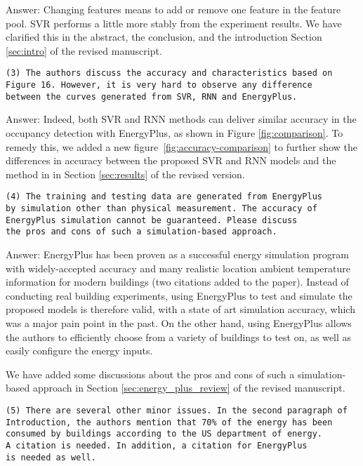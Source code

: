 Answer: Changing features means to add or remove one feature in the
feature pool. SVR performs a little more stably from the experiment
results. We have clarified this in the abstract, the conclusion, and
the introduction Section \ref{sec:intro} of the revised manuscript.

\begin{verbatim}
(3) The authors discuss the accuracy and characteristics based on
Figure 16. However, it is very hard to observe any difference
between the curves generated from SVR, RNN and EnergyPlus.
\end{verbatim}

Answer: Indeed, both SVR and RNN methods can deliver similar accuracy
in the occupancy detection with EnergyPlus, as shown in Figure
\ref{fig:comparison}. To remedy this, we added a new figure~\ref{fig:accuracy-comparison}
to further show the differences in accuracy between the proposed SVR
and RNN models and the method in \cite{dong2014real} in Section
\ref{sec:results} of the revised version.

\begin{verbatim}
(4) The training and testing data are generated from EnergyPlus
by simulation other than physical measurement. The accuracy of
EnergyPlus simulation cannot be guaranteed. Please discuss
the pros and cons of such a simulation-based approach.
\end{verbatim}

Answer: EnergyPlus has been proven as a successful energy simulation
program with widely-accepted accuracy and many realistic location
ambient temperature information for modern buildings (two citations
added to the paper).  Instead of conducting real building experiments,
using EnergyPlus to test and simulate the proposed models is therefore
valid, with a state of art simulation accuracy, which was a major pain
point in the past. On the other hand, using EnergyPlus allows the
authors to efficiently choose from a variety of buildings to test on,
as well as easily configure the energy inputs.

We have added some discussions about the pros and cons of such a
simulation-based approach in Section \ref{sec:energy_plus_review} of
the revised manuscript.

\begin{verbatim}
(5) There are several other minor issues. In the second paragraph of
Introduction, the authors mention that 70% of the energy has been
consumed by buildings according to the US department of energy.
A citation is needed. In addition, a citation for EnergyPlus
is needed as well.
\end{verbatim}

